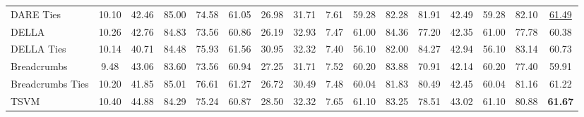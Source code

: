 \begin{table*}
{\begin{tabular}{lcccccccc|c|cc|cccc}
      DARE Ties                              & 10.10                                     & 42.46            & 85.00                                      & 74.58                                  & 61.05                                 & 26.98                                   & 31.71                         & 7.61     & 59.28           & 82.28           & 81.91       & 42.49 & 59.28 & 82.10 & \underline{61.49} \\
      DELLA                                  & 10.26                                     & 42.76            & 84.83                                      & 73.56                                  & 60.86                                 & 26.19                                   & 32.93                         & 7.47     & 61.00           & 84.36           & 77.20       & 42.35 & 61.00 & 77.78 & 60.38             \\
      DELLA  Ties                            & 10.14                                     & 40.71            & 84.48                                      & 75.93                                  & 61.56                                 & 30.95                                   & 32.32                         & 7.40     & 56.10           & 82.00           & 84.27       & 42.94 & 56.10 & 83.14 & 60.73             \\
      Breadcrumbs                            & 9.48                                      & 43.06            & 83.60                                      & 73.56                                  & 60.94                                 & 27.25                                   & 31.71                         & 7.52     & 60.20           & 83.88           & 70.91       & 42.14 & 60.20 & 77.40 & 59.91             \\
      Breadcrumbs Ties                       & 10.20                                     & 41.85            & 85.01                                      & 76.61                                  & 61.27                                 & 26.72                                   & 30.49                         & 7.48     & 60.04           & 81.83           & 80.49       & 42.45 & 60.04 & 81.16 & 61.22             \\
      TSVM                                   & 10.40                                     & 44.88            & 84.29                                      & 75.24                                  & 60.87                                 & 28.50                                   & 32.32                         & 7.65     & 61.10           & 83.25           & 78.51       & 43.02 & 61.10 & 80.88 & \textbf{61.67}    \\
      \bottomrule
    \end{tabular}
  }
\end{table*}

